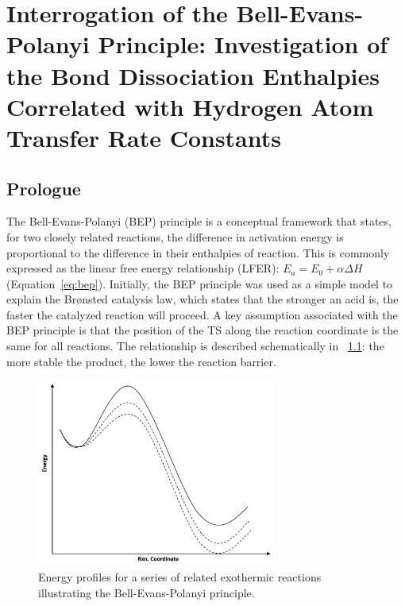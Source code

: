 
\chapter{Interrogation of the Bell-Evans-Polanyi Principle: Investigation of
the Bond Dissociation Enthalpies Correlated with Hydrogen Atom Transfer Rate
Constants} \label{ch:bde}

\begin{doublespace}
\section{Prologue}

The Bell-Evans-Polanyi (BEP) principle is a conceptual framework that states,
for two closely related reactions, the difference in activation energy is
proportional to the difference in their enthalpies of
reaction.\cite{Bell1936,Evans1938,Dill2003} This is commonly expressed as the
linear free energy relationship (LFER): $E_a = E_0 + \alpha \Delta H$
(Equation~\ref{eq:bep}). Initially, the BEP principle was used as a simple model
to explain the Br{\o}nsted catalysis law, which states that the stronger an acid
is, the faster the catalyzed reaction will proceed.\cite{Bronsted1924} A key
assumption associated with the BEP principle is that the position of the TS
along the reaction coordinate is the same for all reactions. The relationship is
described schematically in ~\ref{fig:bep}: the more stable the product, the
lower the reaction barrier.

\begin{figure}[!htbp]
  \centering
  \includegraphics[width=0.7\textwidth]{figures/bep}
  \caption{Energy profiles for a series of related exothermic reactions
  illustrating the Bell-Evans-Polanyi principle.} \label{fig:bep}
\end{figure}


\end{doublespace}
